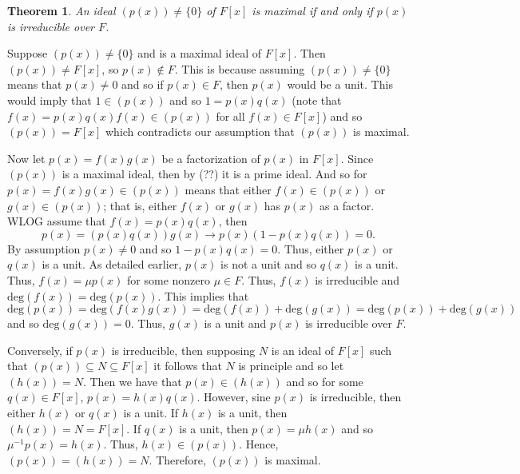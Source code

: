 \documentclass{article}
\makeatletter
\newtheorem{theorem}{Theorem}[section]
\theoremstyle{definition}
\theoremstyle{remark}
\let\oldproofname=\proofname
\renewcommand{\proofname}{\bf{\textit{\oldproofname}}}
\theoremstyle{definition}
\renewenvironment{proof}[1][\proofname]{\par
  \pushQED{\qed}%
  \normalfont \topsep6\p@\@plus6\p@\relax
  \list{}{\leftmargin=0mm
          \rightmargin=0mm
          \settowidth{\itemindent}{\itshape#1}%
          \labelwidth=4mm
          \parsep=0pt \listparindent=0mm%
  }
  \item[\hskip\labelsep
        \itshape
    #1\@addpunct{.}]\ignorespaces
}{%
  \popQED\endlist\@endpefalse
}
\makeatother
\begin{document}
    \begin{theorem}
        An ideal $(p(x))\neq \{0\}$ of $F[x]$ is maximal if and only if $p(x)$ is irreducible over $F$.
    \end{theorem}
        \begin{proof}
            Suppose $(p(x))\neq \{0\}$ and is a maximal ideal of $F[x]$. Then $(p(x))\neq F[x]$, so $p(x)\notin F$. This is because assuming $(p(x))\neq \{0\}$ means that $p(x)\neq 0$ and so if $p(x)\in F$, then $p(x)$ would be a unit. This would imply that $1\in (p(x))$ and so $1=p(x)q(x)$  (note that $f(x)=p(x)q(x)f(x)\in (p(x))$ for all $f(x)\in F[x]$) and so $(p(x))=F[x]$ which contradicts our assumption that $(p(x))$ is maximal.\par\hspace{4mm} Now let $p(x)=f(x)g(x)$ be a factorization of $p(x)$ in $F[x]$. Since $(p(x))$ is a maximal ideal, then by (??) it is a prime ideal. And so for $p(x)=f(x)g(x)\in (p(x))$ means that either $f(x)\in (p(x))$ or $g(x)\in(p(x))$; that is, either $f(x)$ or $g(x)$ has $p(x)$ as a factor. WLOG assume that $f(x)=p(x)q(x)$, then
                \begin{equation*}
                    p(x)=(p(x)q(x))g(x)\rightarrow p(x)(1-p(x)q(x))=0.        
                \end{equation*}
            By assumption $p(x)\neq 0$ and so $1-p(x)q(x)=0$. Thus, either $p(x)$ or $q(x)$ is a unit. As detailed earlier, $p(x)$ is not a unit and so $q(x)$ is a unit. Thus, $f(x)=\mu p(x)$ for some nonzero $\mu\in F$. Thus, $f(x)$ is irreducible and $\text{deg}(f(x))=\text{deg}(p(x))$. This implies that
                \begin{equation*}
                    \text{deg}(p(x))=\text{deg}(f(x)g(x))=\text{deg}(f(x))+\text{deg}(g(x))=\text{deg}(p(x))+\text{deg}(g(x))
                \end{equation*}
             and so $\text{deg}(g(x))=0$. Thus, $g(x)$ is a unit and $p(x)$ is irreducible over $F$.\par\hspace{4mm} Conversely, if $p(x)$ is irreducible, then supposing $N$ is an ideal of $F[x]$ such that $(p(x))\subseteq N\subseteq F[x]$ it follows that $N$ is principle and so let $(h(x))=N$. Then we have that $p(x)\in (h(x))$ and so for some $q(x)\in F[x]$, $p(x)=h(x)q(x)$. However, sine $p(x)$ is irreducible, then either $h(x)$ or $q(x)$ is a unit. If $h(x)$ is a unit, then $(h(x))=N=F[x]$. If $q(x)$ is a unit, then $p(x)=\mu h(x)$ and so $\mu^{-1}p(x)=h(x)$. Thus, $h(x)\in(p(x))$. Hence, $(p(x))=(h(x))=N$. Therefore, $(p(x))$ is maximal.  
        \end{proof}
\end{document}
